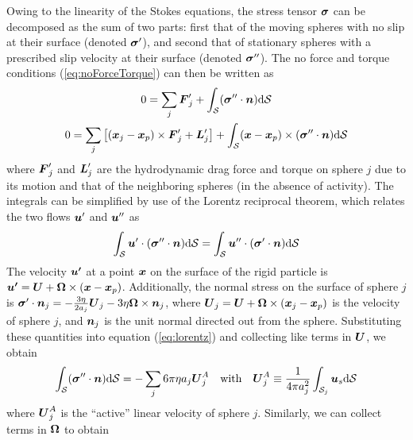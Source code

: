 \begin{appendices}
Owing to the linearity of the Stokes equations, the stress tensor $\boldsymbol{\sigma}$ can be decomposed as the sum of two parts: first that of the moving spheres with no slip at their surface (denoted $\boldsymbol{\sigma}'$), and second that of stationary spheres with a prescribed slip velocity at their surface (denoted $\boldsymbol{\sigma}''$).  The no force and torque conditions (\ref{eq:noForceTorque}) can then be written as
\begin{gather}
    0 = \sum_j \boldsymbol{F}'_j +  \int_{\mathcal{S}} (\boldsymbol{\sigma}''\cdot\boldsymbol{n}) \mathrm{d}\mathcal{S} \label{eq:noForce}
    \\
    0 = \sum_j \left[(\boldsymbol{x}_j-\boldsymbol{x}_p)\times \boldsymbol{F}'_j + \boldsymbol{L}'_j\right] +  \int_{\mathcal{S}} (\boldsymbol{x}-\boldsymbol{x}_p)\times(\boldsymbol{\sigma}''\cdot\boldsymbol{n}) \mathrm{d}\mathcal{S}   \label{eq:noTorque}
\end{gather}
where $\boldsymbol{F}'_j$ and $\boldsymbol{L}'_j$ are the hydrodynamic drag force and torque on sphere $j$ due to its motion and that of the neighboring spheres (in the absence of activity). The integrals can be simplified by use of the Lorentz reciprocal theorem,\autocite{Kim2005} which relates the two flows $\boldsymbol{u}'$ and $\boldsymbol{u}''$ as 
\begin{equation}
    \int_{\mathcal{S}} \boldsymbol{u}'\cdot(\boldsymbol{\sigma}''\cdot\boldsymbol{n})  \mathrm{d}\mathcal{S} =  \int_{\mathcal{S}} \boldsymbol{u}''\cdot(\boldsymbol{\sigma}'\cdot\boldsymbol{n}) \mathrm{d}\mathcal{S} \label{eq:lorentz}
\end{equation}
The velocity $\boldsymbol{u'}$ at a point $\boldsymbol{x}$ on the surface of the rigid particle is $\boldsymbol{u'}=\boldsymbol{U}+\boldsymbol{\Omega}\times(\boldsymbol{x}-\boldsymbol{x}_p)$. Additionally, the normal stress on the surface of sphere $j$ is  $\boldsymbol{\sigma}'\cdot \boldsymbol{n}_j= -\tfrac{3\eta}{2a_j}\boldsymbol{U}_j-3\eta\boldsymbol{\Omega} \times\boldsymbol{n}_j$, where  $\boldsymbol{U}_j = \boldsymbol{U} +\boldsymbol{\Omega}\times(\boldsymbol{x}_j-\boldsymbol{x}_p)$ is the velocity of sphere $j$, and $\boldsymbol{n}_j$ is the unit normal directed out from the sphere.\autocite{Stone1996} Substituting these quantities into equation (\ref{eq:lorentz}) and collecting like terms in $\boldsymbol{U}$, we obtain
\begin{equation}
    \int_{\mathcal{S}} (\boldsymbol{\sigma}''\cdot\boldsymbol{n}) \mathrm{d}\mathcal{S}  = -\sum_j 6\pi\eta a_j \boldsymbol{U}_j^A \quad \text{with}\quad \boldsymbol{U}_j^A \equiv \frac{1}{4\pi a_j^2}\int_{\mathcal{S}_j} \boldsymbol{u}_s\mathrm{d}\mathcal{S} \label{eq:intForce}
\end{equation}
where $\boldsymbol{U}^A_j$ is the ``active'' linear velocity of sphere $j$. Similarly, we can collect terms in $\boldsymbol{\Omega}$ to obtain
\begin{equation}

\end{equation}
\end{appendices}
